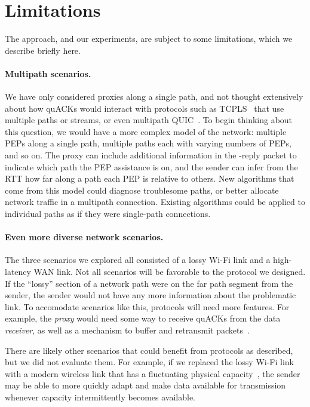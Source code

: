 \section{Limitations}

The \sys approach, and our experiments, are subject to some
limitations, which we describe briefly here.

\paragraph{Multipath scenarios.}
We have only considered \sys proxies along a single path, and not thought
extensively about how quACKs would interact with protocols such as
\mbox{TCPLS}~\cite{rochet2020tcpls} that use multiple paths or streams,
or even multipath QUIC~\cite{de2017multipath}.
To begin thinking about this question, we would have a more complex model of
the network: multiple PEPs along a single path, multiple paths each with varying
numbers of PEPs, and so on. The proxy can include
additional information in the \sys-reply packet to indicate which path the
PEP assistance is on, and the sender can infer from the RTT how far along a path each PEP
is relative to others. New \sys algorithms that come from this model could
diagnose troublesome paths, or better allocate network traffic in a multipath
connection. Existing algorithms could be applied to individual paths as if they
were single-path connections.

\paragraph{Even more diverse network scenarios.}
The three scenarios we explored all consisted of a lossy Wi-Fi link and a
high-latency WAN link. Not all scenarios will be favorable to the
\sys protocol we designed.
If the ``lossy'' section of a network path were on the far path segment from the
sender, the sender would not have any more information about the problematic
link. To accomodate scenarios like this, \sys protocols will need
more features. For example, the \emph{proxy} would need some way to receive
quACKs from the data \emph{receiver}, as well as a mechanism to buffer and
retransmit packets~\cite{balakrishnan1995snoop,caini2006pepsal}.

There are likely other scenarios that could benefit from \sys protocols as
described, but we did not evaluate them. For example, if we replaced the lossy Wi-Fi
link with a modern wireless link that has a fluctuating physical
capacity~\cite{niu2015survey,burchardt2014vlc,koenig2013wireless},
the sender may be able to more quickly adapt and make
data available for transmission whenever capacity intermittently becomes available.


